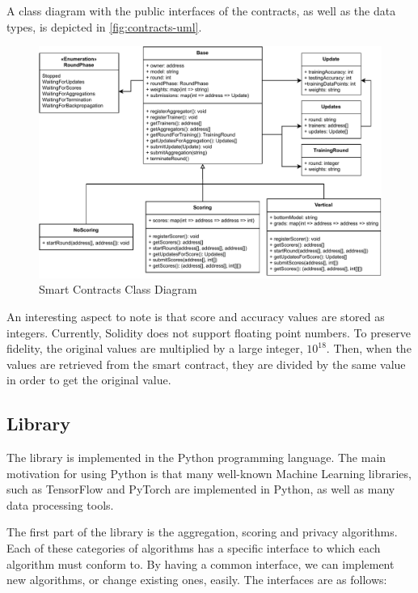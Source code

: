 A class diagram with the public interfaces of the contracts, as well as the data types, is depicted in \autoref{fig:contracts-uml}.

\begin{figure}[!ht]
    \centering
    \centering
    \includegraphics[width=1\textwidth]{graphics/smart-contract-uml.pdf}
    \caption{Smart Contracts Class Diagram}
    \label{fig:contracts-uml}
\end{figure}

An interesting aspect to note is that score and accuracy values are stored as integers. Currently, Solidity does not support floating point numbers. To preserve fidelity, the original values are multiplied by a large integer, $10^{18}$. Then, when the values are retrieved from the smart contract, they are divided by the same value in order to get the original value.

\subsection{Library}

The library is implemented in the Python \cite{10.5555/1593511} programming language. The main motivation for using Python is that many well-known Machine Learning libraries, such as TensorFlow \cite{tensorflow2015-whitepaper} and PyTorch \cite{NEURIPS2019_9015} are implemented in Python, as well as many data processing tools.

The first part of the library is the aggregation, scoring and privacy algorithms. Each of these categories of algorithms has a specific interface to which each algorithm must conform to. By having a common interface, we can implement new algorithms, or change existing ones, easily. The interfaces are as follows:

